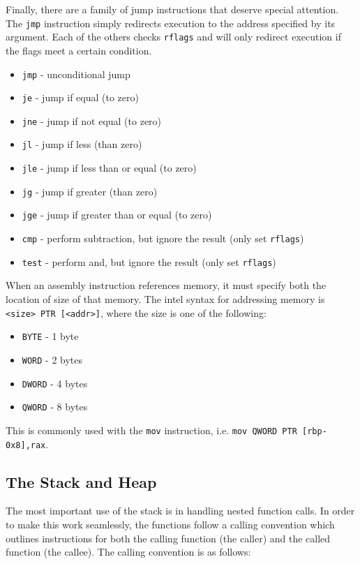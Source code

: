 Finally, there are a family of jump instructions that deserve special attention.
The \texttt{jmp} instruction simply redirects execution to the address specified
by its argument. Each of the others checks \texttt{rflags} and will only
redirect execution if the flags meet a certain condition.

\begin{itemize}
    \item \texttt{jmp} - unconditional jump
    \item \texttt{je} - jump if equal (to zero)
    \item \texttt{jne} - jump if not equal (to zero)
    \item \texttt{jl} - jump if less (than zero)
    \item \texttt{jle} - jump if less than or equal (to zero)
    \item \texttt{jg} - jump if greater (than zero)
    \item \texttt{jge} - jump if greater than or equal (to zero)
    \item \texttt{cmp} - perform subtraction, but ignore the result (only set
        \texttt{rflags})
    \item \texttt{test} - perform and, but ignore the result (only set
        \texttt{rflags})
\end{itemize}

When an assembly instruction references memory, it must specify both the
location of size of that memory. The intel syntax for addressing memory is
\texttt{<size> PTR [<addr>]}, where the size is one of the following:
\begin{itemize}
    \item \texttt{BYTE} - 1 byte
    \item \texttt{WORD} - 2 bytes
    \item \texttt{DWORD} - 4 bytes
    \item \texttt{QWORD} - 8 bytes
\end{itemize}


This is commonly used with the \texttt{mov} instruction, i.e. \texttt{mov
QWORD PTR [rbp-0x8],rax}. 

\subsection{The Stack and Heap}
The most important use of the stack is in handling nested function calls. In
order to make this work seamlessly, the functions follow a calling convention
which outlines instructions for both the calling function (the caller) and the
called function (the callee). The calling convention is as follows:

